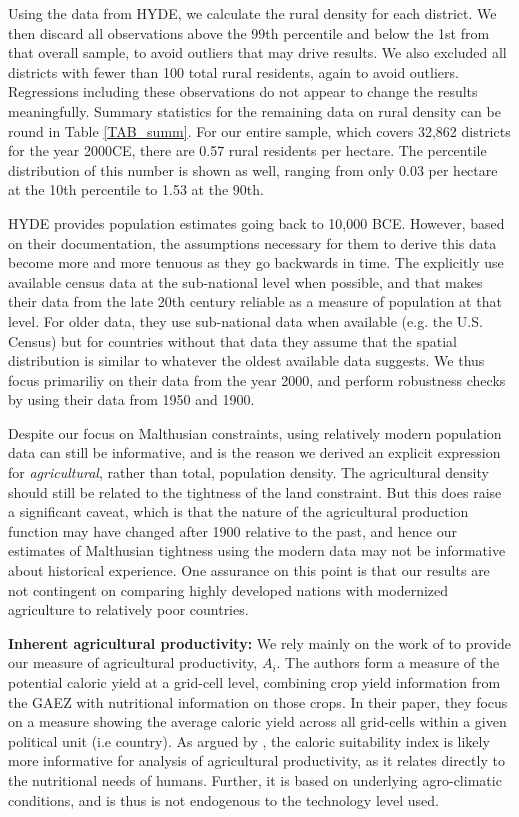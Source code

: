 \documentclass[11pt]{article}
\begin{document}
Using the data from HYDE, we calculate the rural density for each district. We then discard all observations above the 99th percentile and below the 1st from that overall sample, to avoid outliers that may drive results. We also excluded all districts with fewer than 100 total rural residents, again to avoid outliers. Regressions including these observations do not appear to change the results meaningfully. Summary statistics for the remaining data on rural density can be round in Table \ref{TAB_summ}. For our entire sample, which covers 32,862 districts for the year 2000CE, there are 0.57 rural residents per hectare. The percentile distribution of this number is shown as well, ranging from only 0.03 per hectare at the 10th percentile to 1.53 at the 90th. 

HYDE provides population estimates going back to 10,000 BCE. However, based on their documentation, the assumptions necessary for them to derive this data become more and more tenuous as they go backwards in time. The explicitly use available census data at the sub-national level when possible, and that makes their data from the late 20th century reliable as a measure of population at that level. For older data, they use sub-national data when available (e.g. the U.S. Census) but for countries without that data they assume that the spatial distribution is similar to whatever the oldest available data suggests. We thus focus primariliy on their data from the year 2000, and perform robustness checks by using their data from 1950 and 1900.

Despite our focus on Malthusian constraints, using relatively modern population data can still be informative, and is the reason we derived an explicit expression for \textit{agricultural}, rather than total, population density. The agricultural density should still be related to the tightness of the land constraint. But this does raise a significant caveat, which is that the nature of the agricultural production function may have changed after 1900 relative to the past, and hence our estimates of Malthusian tightness using the modern data may not be informative about historical experience. One assurance on this point is that our results are not contingent on comparing highly developed nations with modernized agriculture to relatively poor countries. 

\vspace{.5cm}\noindent\textbf{Inherent agricultural productivity:} We rely mainly on the work of \citet{galorozak2016} to provide our measure of agricultural productivity, $A_i$. The authors form a measure of the potential caloric yield at a grid-cell level, combining crop yield information from the GAEZ with nutritional information on those crops. In their paper, they focus on a measure showing the average caloric yield across all grid-cells within a given political unit (i.e country). As argued by \citet{galorozak2016}, the caloric suitability index is likely more informative for analysis of agricultural productivity, as it relates directly to the nutritional needs of humans. Further, it is based on underlying agro-climatic conditions, and is thus is not endogenous to the technology level used.
\end{document}
